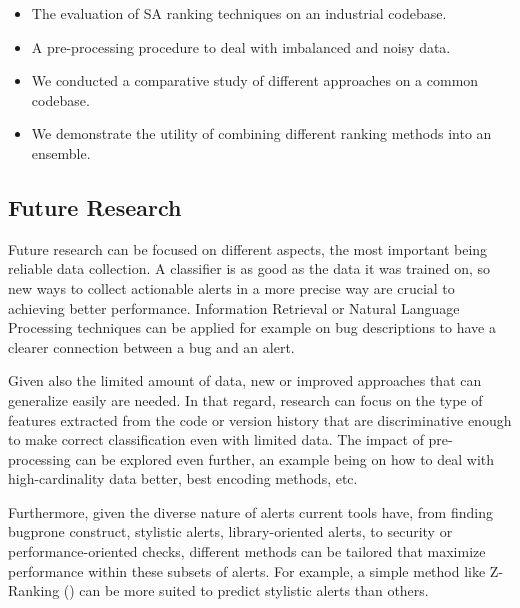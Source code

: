 \begin{itemize}
\item The evaluation of SA ranking techniques on an industrial codebase. 
\item A pre-processing procedure to deal with imbalanced and noisy data.
\item We conducted a comparative study of different approaches on a common codebase.
\item We demonstrate the utility of combining different ranking methods into an ensemble. 

\end{itemize}


\subsection{Future Research}


Future research can be focused on different aspects, the most important being reliable data collection. A classifier is as good as the data it was trained on, so new ways to collect actionable alerts in a more precise way are crucial to achieving better performance. Information Retrieval or Natural Language Processing techniques can be applied for example on bug descriptions to have a clearer connection between a bug and an alert.

Given also the limited amount of data, new or improved approaches that can generalize easily are needed. In that regard, research can focus on the type of features extracted from the code or version history that are discriminative enough to make correct classification even with limited data. The impact of pre-processing can be explored even further, an example being on how to deal with high-cardinality data better, best encoding methods, etc.

Furthermore, given the diverse nature of alerts current tools have, from finding bugprone construct, stylistic alerts, library-oriented alerts, to security or performance-oriented checks, different methods can be tailored that maximize performance within these subsets of alerts. For example, a simple method like Z-Ranking (\cite{z-ranking}) can be more suited to predict stylistic alerts than others.

